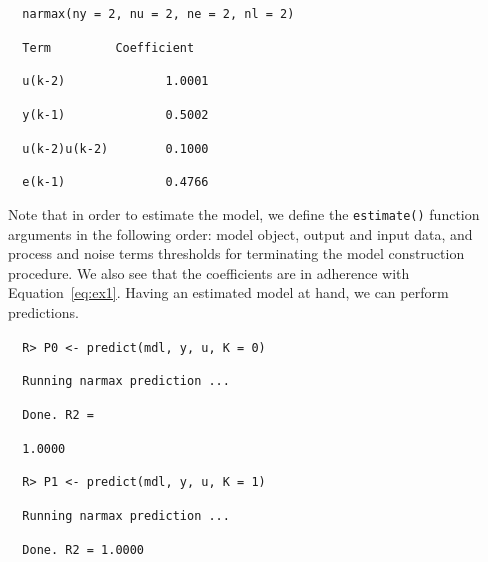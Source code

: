 \documentclass[preprint,12pt, a4paper]{elsarticle}
\begin{document}
\verb|	narmax(ny = 2, nu = 2, ne = 2, nl = 2)|

\verb||

\verb|	Term         Coefficient|

\verb|	u(k-2)              1.0001|

\verb|	y(k-1)              0.5002|

\verb|	u(k-2)u(k-2)        0.1000|

\verb|	e(k-1)              0.4766|

Note that in order to estimate the model, we define the \verb|estimate()| function arguments in the following order: model object, output and input data, and process and noise terms thresholds for terminating the model construction procedure. We also see that the coefficients are in adherence with Equation~\ref{eq:ex1}. Having an estimated model at hand, we can perform predictions.

\verb|	R> P0 <- predict(mdl, y, u, K = 0)|

\verb|	Running narmax prediction ... |

\verb|	Done. R2 = |

\verb|	1.0000|

\verb|	R> P1 <- predict(mdl, y, u, K = 1)|

\verb|	Running narmax prediction ... |

\verb|	Done. R2 = 1.0000|
\end{document}
